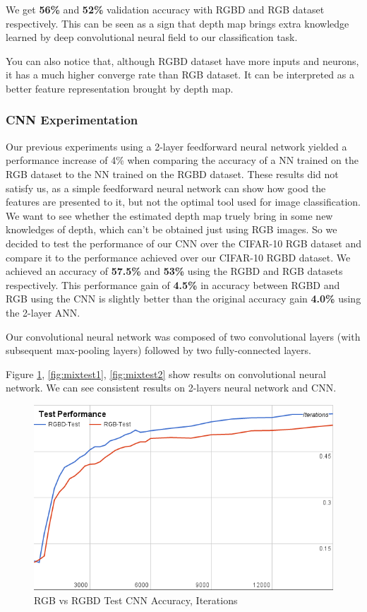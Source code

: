 \documentclass[10pt,twocolumn,letterpaper]{article}
\begin{document}
We get {\bf56\%} and {\bf52\%} validation accuracy with RGBD and RGB dataset respectively.
This can be seen as a sign that depth map brings extra knowledge
 learned by deep convolutional neural field to our classification task.

You can also notice that, although RGBD dataset have more inputs and neurons,
  it has a much higher converge rate than RGB dataset. 
 It can be interpreted as a better feature representation brought by depth map.

\subsubsection{CNN Experimentation}
Our previous experiments using a 2-layer feedforward neural network yielded a performance increase of 4\% when comparing the accuracy of a NN trained on the RGB dataset to the NN trained on the RGBD dataset. These results did not satisfy us, as a simple feedforward neural network can show how good the features are presented to it, but not the optimal tool used for image classification. We want to see whether the estimated depth map truely bring in some new knowledges of depth, which can't be obtained just using RGB images. So we decided to test the performance of our CNN  \cite{krizhevsky2012imagenet} over the CIFAR-10 RGB dataset and compare it to the performance achieved over our CIFAR-10 RGBD dataset. We achieved an accuracy of {\bf57.5\%} and {\bf53\%} using the RGBD and RGB datasets respectively. This performance gain of {\bf4.5\%} in accuracy between RGBD and RGB using the CNN is slightly better than the original accuracy gain {\bf4.0\%} using the 2-layer ANN.

Our convolutional neural network was composed of two convolutional layers (with subsequent max-pooling layers) followed by two fully-connected layers. 

Figure \ref{fig:mixtest0}, \ref{fig:mixtest1}, \ref{fig:mixtest2} show results on convolutional neural network. We can see consistent results on 2-layers neural network and CNN.

\begin{figure}[!t]
\includegraphics[width=\linewidth]{../presentation/test_conv.png}
\caption{RGB vs RGBD Test CNN Accuracy, Iterations}
\label{fig:mixtest0}
\end{figure}
 
\end{document}
